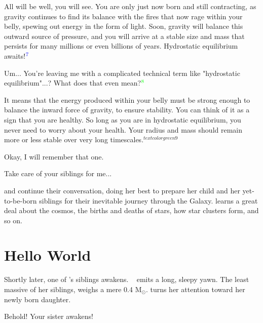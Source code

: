\documentclass[main.tex]{subfiles}
\begin{document}
\par \Pleione All will be well, you will see.  You are only just now born and still contracting, as gravity continues to find its balance with the fires that now rage within your belly, spewing out energy in the form of light.  Soon, gravity will balance this outward source of pressure, and you will arrive at a stable size and mass that persists for many millions or even billions of years. Hydrostatic equilibrium awaits!$^{\textcolor{blue}{7}}$

\par \Maia Um... You're leaving me with a complicated technical term like "hydrostatic equilibrium"...?  What does that even mean?$^{\textcolor{green}{8}}$

\par \Pleione It means that the energy produced within your belly must be strong enough to balance the inward force of gravity, to ensure stability.  You can think of it as a sign that you are healthy.  So long as you are in hydrostatic equilibrium, you never need to worry about your health.  Your radius and mass should remain more or less stable over very long timescales.$^{textcolor{green}{9}}$ 

\par \Maia Okay, I will remember that one.

\par \Pleione Take care of your siblings for me...

\par \nar \rmmaia and \rmpleione continue their conversation, \rmpleione doing her best to prepare her child and her yet-to-be-born siblings for their inevitable journey through the Galaxy.  \rmmaia learns a great deal about the cosmos, the births and deaths of stars, how star clusters form, and so on.

\section{Hello World} \label{hello}

\par \nar Shortly later, one of \rmmaia's siblings awakens.  \rmelectra~ emits a long, sleepy yawn.  The least massive of her siblings, \rmelectra weighs a mere 0.4 M$_{\odot}$.  \rmpleione turns her attention toward her newly born daughter.

\par \Pleione Behold!  Your sister awakens!
\end{document}

